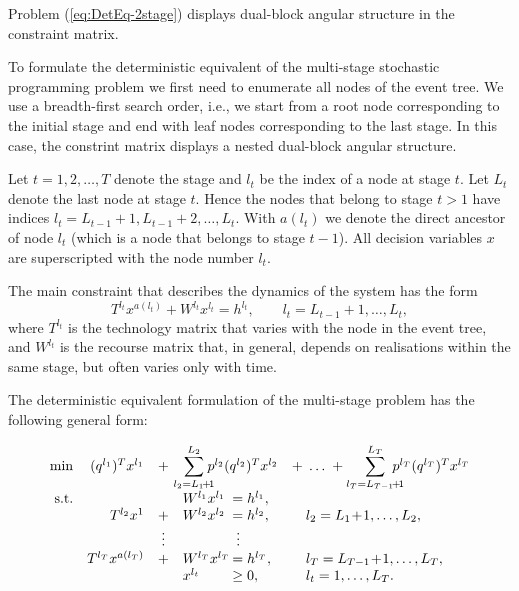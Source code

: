 {Problem (\ref{eq:DetEq-2stage}) displays dual-block angular structure
in the constraint matrix.


To formulate the deterministic equivalent of the multi-stage 
stochastic programming problem we first need to enumerate all nodes 
of the event tree. We use a breadth-first 
search order, i.e., we start from a root node corresponding 
to the initial stage and end with leaf nodes corresponding 
to the last stage. In this case, the constrint matrix displays
a nested dual-block angular structure.

Let $t = 1,2,\ldots,T$ denote the stage and $l_t$ be the index of a 
node at stage $t$.
Let $L_t$ denote the last node at stage $t$. Hence 
the nodes that belong to stage $t > 1$ have indices 
$l_t = L_{t-1} \! + \! 1, L_{t-1} \! + \! 2, \dots, L_t$. 
With $a(l_t)$ we denote the direct ancestor of node $l_t$ (which is a 
node that belongs to stage $t-1$).
All decision variables $x$ are superscripted with the node number 
$l_t$.

The main constraint that describes the dynamics of the system has the form 
\[
  T^{l_t}x^{a(l_t)} +W^{l_t}x^{l_t} =h^{l_t}, \qquad l_t =L_{t-1}+1,\dots,L_t,
\]
%
where $T^{l_t}$ is the technology matrix that varies 
with the node in the event tree, and $W^{l_t}$ is the recourse
matrix that, in general, depends on realisations within the same stage,
but often varies only with time.

The deterministic equivalent formulation of the multi-stage 
problem has the following general form:

\begin{equation}
  \begin{array}{rrclll}
    \min & (q^{l_1})^T x^{l_1} & + & \!\!\!\!{\displaystyle \sum_{l_2=L_1 \!+\! 1}^{L_2}} \!\!\! p^{l_2} (q^{l_2})^T x^{l_2} && \!\!\!\!\!\!  + \; \ldots \; + {\displaystyle \sum_{l_T = L_{T-1} \! + \! 1}^{L_T}} \!\!\!\!\! p^{l_T} (q^{l_T})^T x^{l_T} \\
    \mbox{s.t.} & & & W^{l_1} x^{l_1} & \hspace{-1.5cm} = h^{l_1}, \\
    & T^{l_2} x^1 & + & W^{l_2} x^{l_2} & \hspace{-1.5cm} = h^{l_2}, & l_2 = L_1 \!+\! 1,\dots,L_2, \\
    & & \vdots & & \hspace{-1.4cm} \vdots \\
    & T^{l_T} x^{a(l_T)} & + &  W^{l_T} x^{l_T} & \hspace{-1.5cm} = h^{l_T}, & l_T = L_{T-1} \! + \! 1, \dots, L_T, \\
    & & & x^{l_t} & \hspace{-1.5cm} \geq 0, & l_t = 1,\dots, L_{T}. \\
    \label{DetEquiv}
  \end{array} 
\end{equation}

}
